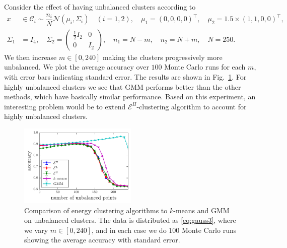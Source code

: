 \documentclass[aps,preprint,nofootinbib,floatfix]{revtex4-1}
\newcommand\C{{\mathcal{C}}}
\begin{document}
Consider the effect of having 
unbalanced clusters according to
\begin{equation}
\label{eq:gauss3}
\begin{split}
x &\in \C_i \sim  
\dfrac{n_i}{N} \mathcal{N}(\mu_i,\Sigma_i) \quad (i=1,2), \quad 
\mu_1 = (0,0,0,0)^\top , \quad
\mu_2 = 1.5\times (1,1,0,0)^\top, \\
\Sigma_1 &= I_4, \quad
\Sigma_2 = \left( 
\begin{array}{c|c} 
\tfrac{1}{2} I_2 & 0  \\ \hline
0 & I_2 
\end{array}\right), \quad
n_1 = N - m, \quad  n_2 = N + m, \quad N=250.
\end{split}
\end{equation}
We then increase $m \in [0,240]$ making
the clusters progressively more unbalanced.
We plot the average accuracy over
$100$ Monte Carlo runs for each $m$, with error bars indicating 
standard error. 
The results are shown in Fig.~\ref{fig:unbalanced}.
For highly unbalanced clusters we see that GMM performs better than
the other methods, which have basically similar performance.
Based on this experiment, an interesting problem would be to
extend $\mathcal{E}^H$-clustering algorithm to account for 
highly unbalanced clusters.

\begin{figure}
\includegraphics[width=0.5\textwidth]{normal_unbalanced.pdf}\vspace{-1em}
\caption{
\label{fig:unbalanced}
Comparison of energy clustering algorithms to $k$-means and GMM on
unbalanced clusters. The data is distributed as \eqref{eq:gauss3}, where
we vary $m \in [0, 240]$, and in each case we do $100$ Monte Carlo runs
showing the average accuracy with standard error.
}
\end{figure}
\end{document}
